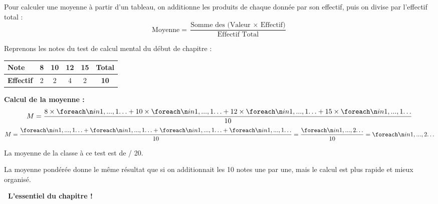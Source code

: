 \documentclass[a4paper]{book}
\begin{document}
    
    \begin{theoreme}
        Pour calculer une moyenne à partir d'un tableau, on additionne les produits de chaque donnée par son effectif, puis on divise par l'effectif total :
        \[ \text{Moyenne} = \frac{\text{Somme des (Valeur $\times$ Effectif)}}{\text{Effectif Total}} \]
    \end{theoreme}
    
    
    \begin{exemple}
        Reprenons les notes du test de calcul mental du début de chapitre :
        \begin{center}
        \begin{tabular}{|l|c|c|c|c|c|}
        \hline
        \textbf{Note} & 8 & 10 & 12 & 15 & \textbf{Total} \\ \hline
        \textbf{Effectif} & 2 & 2 & 4 & 2 & \textbf{10} \\ \hline
        \end{tabular}
        \end{center}
    
        \textbf{Calcul de la moyenne :}
        \[ M = \frac{8 \times \points[1] + 10 \times \points[1] + 12 \times \points[1] + 15 \times \points[1]}{10} \]
        \[ M = \frac{\points[1] + \points[1] + \points[1] + \points[1]}{10} = \frac{\points[2]}{10} = \points[2] \]
        
        
        La moyenne de la classe à ce test est de \points[2] / 20.
    \end{exemple}
    
    \begin{remarque}
        La moyenne pondérée donne le même résultat que si on additionnait les 10 notes une par une, mais le calcul est plus rapide et mieux organisé.
    \end{remarque}

    \vfill %
    
    \begin{center}
        \Large \bfseries \color{ProcessBlue} \faLightbulb\ L'essentiel du chapitre !
    \end{center}
    
\end{document}
